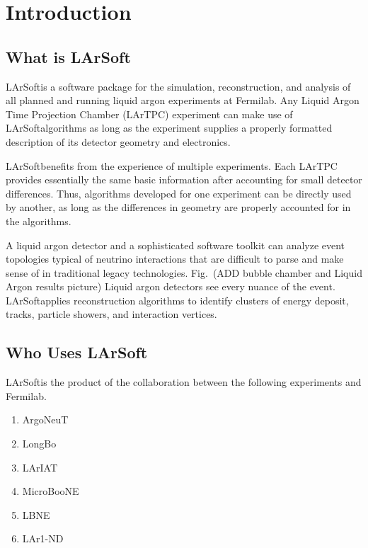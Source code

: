 \documentclass[12pt]{elsarticle}
\newcommand{\larsoft}{LArSoft}
\begin{document}
\maketitle
{}
\section{Introduction}
\subsection{What is \larsoft}
\larsoft is a software package for the simulation, reconstruction, and analysis of all planned and running liquid argon experiments at Fermilab. Any Liquid Argon Time Projection Chamber (LArTPC) experiment can make use of \larsoft algorithms as long as the experiment supplies a properly formatted description of its detector geometry and electronics. 

\larsoft  benefits from the experience of multiple experiments.  Each LArTPC provides essentially the same basic information after accounting for small detector differences.  Thus, algorithms developed for one experiment can be directly used by another, as long as the differences in geometry are properly accounted for in the algorithms.  

A liquid argon detector and a sophisticated software toolkit can analyze event topologies typical of neutrino interactions that are difficult to parse and make sense of in traditional legacy technologies. Fig.~(ADD bubble chamber and Liquid Argon results picture)
Liquid argon detectors see every nuance of the event. \larsoft applies reconstruction algorithms to identify clusters of energy deposit, tracks, particle showers, and interaction vertices.

\subsection{Who Uses \larsoft}
\larsoft is the product of the collaboration between the following experiments and Fermilab.
\begin{enumerate}
\item ArgoNeuT\cite{argo-ref}
\item LongBo\cite{longbo-ref}
\item LArIAT\cite{lariat-ref}
\item MicroBooNE\cite{micro-ref}
\item LBNE\cite{lbne-ref}
\item LAr1-ND\cite{lar1-ref}
\end{enumerate}
\end{document}
